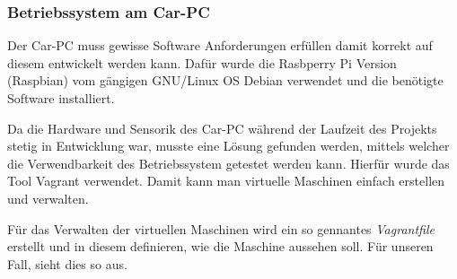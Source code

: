 \subsubsection{Betriebssystem am Car-PC}
\label{subsec:oscarpc}

Der Car-PC muss gewisse Software Anforderungen erfüllen damit korrekt auf diesem entwickelt werden kann. Dafür wurde die Rasbperry Pi Version (Raspbian) vom gängigen GNU/Linux OS Debian verwendet und die benötigte Software installiert.

Da die Hardware und Sensorik des Car-PC während der Laufzeit des Projekts stetig in Entwicklung war, musste eine Lösung gefunden werden, mittels welcher die Verwendbarkeit des Betriebssystem getestet werden kann. Hierfür wurde das Tool Vagrant\cite{MELD.CH3-vagrant.website} verwendet. Damit kann man virtuelle Maschinen einfach erstellen und verwalten. 

Für das Verwalten der virtuellen Maschinen wird ein so gennantes \textit{Vagrantfile} erstellt und in diesem definieren, wie die Maschine aussehen soll. Für unseren Fall, sieht dies so aus.

